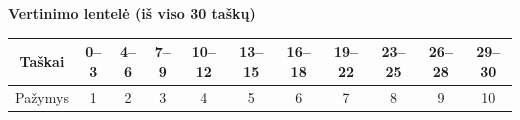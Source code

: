 \documentclass[12pt]{exam}
\begin{document}
\vfill 

\begin{center}
\textbf{Vertinimo lentelė (iš viso 30 taškų)}\par\medskip
\setlength{\tabcolsep}{5pt}
\renewcommand{\arraystretch}{1.3}
\begin{tabular}{|c|*{10}{c|}}
\hline
Taškai & 0--3 & 4--6 & 7--9 & 10--12 & 13--15 & 16--18 & 19--22 & 23--25 & 26--28 & 29--30\\\hline
Pažymys & 1 & 2 & 3 & 4 & 5 & 6 & 7 & 8 & 9 & 10\\\hline
\end{tabular}
\end{center}
\end{document}
